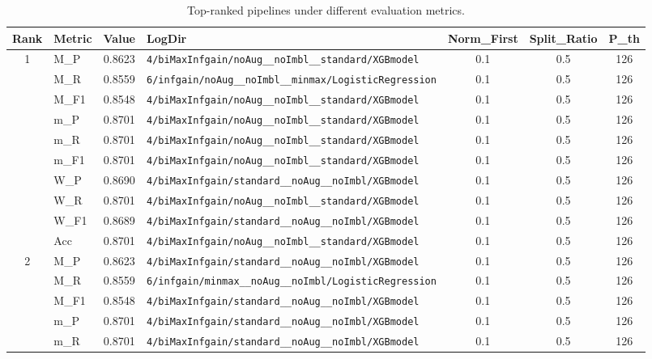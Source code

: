 \begin{table}[htbp]
\caption{Top-ranked pipelines under different evaluation metrics.}
\label{tab:rank_metric_vertical}
\centering
\small
\setlength{\tabcolsep}{4pt}
\begin{tabular}{|c|l|c|>{\ttfamily\footnotesize}p{7.2cm}|c|c|c|}
\hline
Rank & Metric & Value & LogDir & Norm\_First & Split\_Ratio & P\_th \\
\hline
\multirow{10}{*}{1} & M\_P & 0.8623 & \texttt{4/biMaxInfgain/noAug\_\_noImbl\_\_standard/XGBmodel} & 0.1 & 0.5  & 126 \\ 
 & M\_R & 0.8559 & \texttt{6/infgain/noAug\_\_noImbl\_\_minmax/LogisticRegression} & 0.1 & 0.5  & 126 \\ 
 & M\_F1 & 0.8548 & \texttt{4/biMaxInfgain/noAug\_\_noImbl\_\_standard/XGBmodel} & 0.1 & 0.5  & 126 \\ 
 & m\_P & 0.8701 & \texttt{4/biMaxInfgain/noAug\_\_noImbl\_\_standard/XGBmodel} & 0.1 & 0.5  & 126 \\ 
 & m\_R & 0.8701 & \texttt{4/biMaxInfgain/noAug\_\_noImbl\_\_standard/XGBmodel} & 0.1 & 0.5  & 126 \\ 
 & m\_F1 & 0.8701 & \texttt{4/biMaxInfgain/noAug\_\_noImbl\_\_standard/XGBmodel} & 0.1 & 0.5  & 126 \\ 
 & W\_P & 0.8690 & \texttt{4/biMaxInfgain/standard\_\_noAug\_\_noImbl/XGBmodel} & 0.1 & 0.5  & 126 \\ 
 & W\_R & 0.8701 & \texttt{4/biMaxInfgain/noAug\_\_noImbl\_\_standard/XGBmodel} & 0.1 & 0.5  & 126 \\ 
 & W\_F1 & 0.8689 & \texttt{4/biMaxInfgain/standard\_\_noAug\_\_noImbl/XGBmodel} & 0.1 & 0.5  & 126 \\ 
 & Acc & 0.8701 & \texttt{4/biMaxInfgain/noAug\_\_noImbl\_\_standard/XGBmodel} & 0.1 & 0.5  & 126 \\ 
\hline
\multirow{10}{*}{2} & M\_P & 0.8623 & \texttt{4/biMaxInfgain/standard\_\_noAug\_\_noImbl/XGBmodel} & 0.1 & 0.5  & 126 \\ 
 & M\_R & 0.8559 & \texttt{6/infgain/minmax\_\_noAug\_\_noImbl/LogisticRegression} & 0.1 & 0.5  & 126 \\ 
 & M\_F1 & 0.8548 & \texttt{4/biMaxInfgain/standard\_\_noAug\_\_noImbl/XGBmodel} & 0.1 & 0.5  & 126 \\ 
 & m\_P & 0.8701 & \texttt{4/biMaxInfgain/standard\_\_noAug\_\_noImbl/XGBmodel} & 0.1 & 0.5  & 126 \\ 
 & m\_R & 0.8701 & \texttt{4/biMaxInfgain/standard\_\_noAug\_\_noImbl/XGBmodel} & 0.1 & 0.5  & 126 \\ 

\end{tabular}
\end{table}
